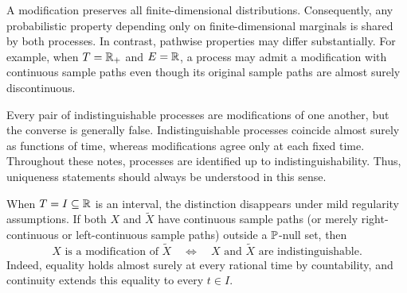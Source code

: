 \documentclass[../Main.tex]{subfiles}
\begin{document}
A modification preserves all finite-dimensional distributions. Consequently, any probabilistic property depending only on finite-dimensional marginals is shared by both processes. In contrast, pathwise properties may differ substantially. For example, when $T=\mathbb{R}_+$ and $E=\mathbb{R}$, a process may admit a modification with continuous sample paths even though its original sample paths are almost surely discontinuous.


Every pair of indistinguishable processes are modifications of one another, but the converse is generally false. Indistinguishable processes coincide almost surely as functions of time, whereas modifications agree only at each fixed time. Throughout these notes, processes are identified up to indistinguishability. Thus, uniqueness statements should always be understood in this sense.

When $T=I\subseteq\mathbb{R}$ is an interval, the distinction disappears under mild regularity assumptions. If both $X$ and $\widetilde X$ have continuous sample paths (or merely right-continuous or left-continuous sample paths) outside a $\mathbb{P}$-null set, then
\[
X\text{ is a modification of }\widetilde X
\quad\Longleftrightarrow\quad
X\text{ and }\widetilde X\text{ are indistinguishable}.
\]
Indeed, equality holds almost surely at every rational time by countability, and continuity extends this equality to every $t\in I$.

\end{document}
